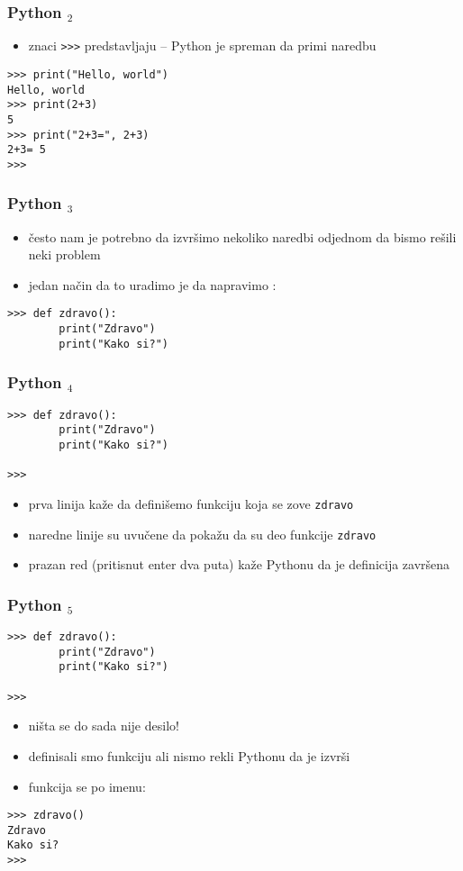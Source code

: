 \documentclass[utf8,compress]{beamer}
\begin{document}
\begin{frame}[fragile]
\frametitle{Python $_2$}
\begin{itemize}
  \item znaci \texttt{>}\texttt{>}\texttt{>} predstavljaju  -- Python je spreman da primi naredbu
\end{itemize}
\begin{verbatim}
>>> print("Hello, world")
Hello, world
>>> print(2+3)
5
>>> print("2+3=", 2+3)
2+3= 5
>>>
\end{verbatim}
\end{frame}

\begin{frame}[fragile]
\frametitle{Python $_3$}
\begin{itemize}
  \item često nam je potrebno da izvršimo nekoliko naredbi odjednom da bismo rešili neki problem
  \item jedan način da to uradimo je da napravimo :
\end{itemize}
\begin{verbatim}
>>> def zdravo():
        print("Zdravo")
        print("Kako si?")
\end{verbatim}
\end{frame}

\begin{frame}[fragile]
\frametitle{Python $_4$}
\begin{verbatim}
>>> def zdravo():
        print("Zdravo")
        print("Kako si?")
        
>>>
\end{verbatim}
\begin{itemize}
  \item prva linija kaže da definišemo funkciju koja se zove \texttt{zdravo}
  \item naredne linije su uvučene da pokažu da su deo funkcije \texttt{zdravo}
  \item prazan red (pritisnut enter dva puta) kaže Pythonu da je definicija završena
\end{itemize}
\end{frame}

\begin{frame}[fragile]
\frametitle{Python $_5$}
\begin{verbatim}
>>> def zdravo():
        print("Zdravo")
        print("Kako si?")
        
>>>
\end{verbatim}
\begin{itemize}
  \item ništa se do sada nije desilo!
  \item definisali smo funkciju ali nismo rekli Pythonu da je izvrši
  \item funkcija se  po imenu:
\end{itemize}
\begin{verbatim}
>>> zdravo()
Zdravo
Kako si?
>>>
\end{verbatim}
\end{frame}
\end{document}
